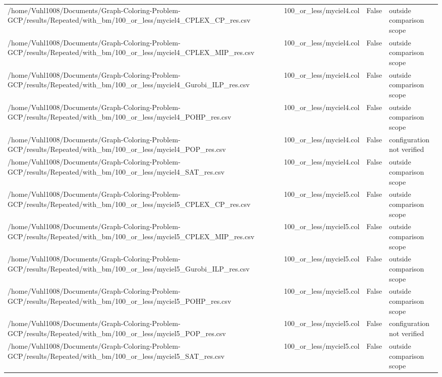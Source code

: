 \begin{table}[htbp]
\begin{tabular}{llll}
/home/Vuhl1008/Documents/Graph-Coloring-Problem-GCP/results/Repeated/with\_bm/100\_or\_less/myciel4\_CPLEX\_CP\_res.csv & 100\_or\_less/myciel4.col & False & outside comparison scope \\
/home/Vuhl1008/Documents/Graph-Coloring-Problem-GCP/results/Repeated/with\_bm/100\_or\_less/myciel4\_CPLEX\_MIP\_res.csv & 100\_or\_less/myciel4.col & False & outside comparison scope \\
/home/Vuhl1008/Documents/Graph-Coloring-Problem-GCP/results/Repeated/with\_bm/100\_or\_less/myciel4\_Gurobi\_ILP\_res.csv & 100\_or\_less/myciel4.col & False & outside comparison scope \\
/home/Vuhl1008/Documents/Graph-Coloring-Problem-GCP/results/Repeated/with\_bm/100\_or\_less/myciel4\_POHP\_res.csv & 100\_or\_less/myciel4.col & False & outside comparison scope \\
/home/Vuhl1008/Documents/Graph-Coloring-Problem-GCP/results/Repeated/with\_bm/100\_or\_less/myciel4\_POP\_res.csv & 100\_or\_less/myciel4.col & False & configuration not verified \\
/home/Vuhl1008/Documents/Graph-Coloring-Problem-GCP/results/Repeated/with\_bm/100\_or\_less/myciel4\_SAT\_res.csv & 100\_or\_less/myciel4.col & False & outside comparison scope \\
/home/Vuhl1008/Documents/Graph-Coloring-Problem-GCP/results/Repeated/with\_bm/100\_or\_less/myciel5\_CPLEX\_CP\_res.csv & 100\_or\_less/myciel5.col & False & outside comparison scope \\
/home/Vuhl1008/Documents/Graph-Coloring-Problem-GCP/results/Repeated/with\_bm/100\_or\_less/myciel5\_CPLEX\_MIP\_res.csv & 100\_or\_less/myciel5.col & False & outside comparison scope \\
/home/Vuhl1008/Documents/Graph-Coloring-Problem-GCP/results/Repeated/with\_bm/100\_or\_less/myciel5\_Gurobi\_ILP\_res.csv & 100\_or\_less/myciel5.col & False & outside comparison scope \\
/home/Vuhl1008/Documents/Graph-Coloring-Problem-GCP/results/Repeated/with\_bm/100\_or\_less/myciel5\_POHP\_res.csv & 100\_or\_less/myciel5.col & False & outside comparison scope \\
/home/Vuhl1008/Documents/Graph-Coloring-Problem-GCP/results/Repeated/with\_bm/100\_or\_less/myciel5\_POP\_res.csv & 100\_or\_less/myciel5.col & False & configuration not verified \\
/home/Vuhl1008/Documents/Graph-Coloring-Problem-GCP/results/Repeated/with\_bm/100\_or\_less/myciel5\_SAT\_res.csv & 100\_or\_less/myciel5.col & False & outside comparison scope \\

\end{tabular}
\end{table}
